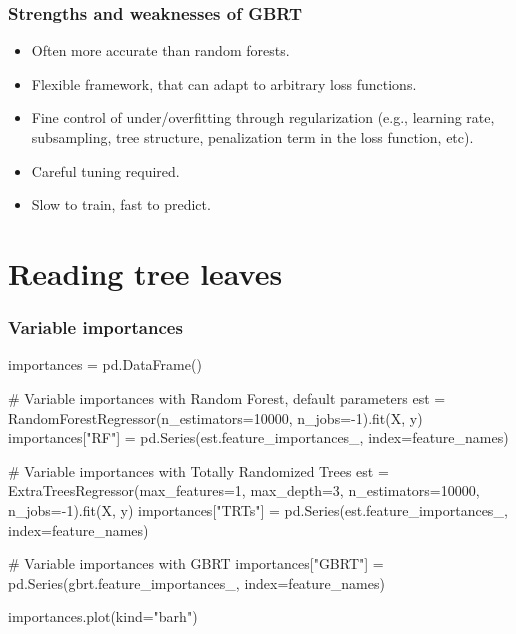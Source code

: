 \documentclass{beamer}
\begin{document}
\begin{frame}
  \frametitle{Strengths and weaknesses of GBRT}

  \begin{itemize}
        \item Often {\color{blue} more accurate} than random forests.

         \vspace{0.25cm}

        \item {\color{blue} Flexible framework}, that can adapt to arbitrary
              loss functions.

        \vspace{0.25cm}

        \item Fine control of under/overfitting through {\color{blue}
              regularization} (e.g., learning rate, subsampling,
              tree structure, penalization term in the loss function, etc).

        \vspace{0.25cm}

        \item {\color{red} Careful tuning} required.

        \vspace{0.25cm}

        \item {\color{red} Slow} to train, {\color{blue} fast} to predict.
  \end{itemize}
\end{frame}




\section{Reading tree leaves}

\begin{frame}[fragile]
  \frametitle{Variable importances}

{\scriptsize
\begin{pythoncode}
importances = pd.DataFrame()

# Variable importances with Random Forest, default parameters
est = RandomForestRegressor(n_estimators=10000, n_jobs=-1).fit(X, y)
importances["RF"] = pd.Series(est.feature_importances_,
                              index=feature_names)

# Variable importances with Totally Randomized Trees
est = ExtraTreesRegressor(max_features=1, max_depth=3,
                          n_estimators=10000, n_jobs=-1).fit(X, y)
importances["TRTs"] = pd.Series(est.feature_importances_,
                                index=feature_names)

# Variable importances with GBRT
importances["GBRT"] = pd.Series(gbrt.feature_importances_,
                                index=feature_names)

importances.plot(kind="barh")
\end{pythoncode}
}

\end{frame}
\end{document}
